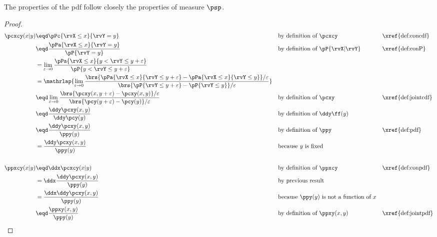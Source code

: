 The properties of the pdf follow closely the properties of measure $\psp$.
\begin{theorem}
\label{thm:conpdf}
\end{theorem}
\begin{proof}
\begin{align*}
  \pcxcy(x|y)
    &\eqd \pPc{\rvX\le x}{\rvY=y}
    &&    \text{by definition of $\pcxcy$}              &&\text{\xref{def:concdf}}
  \\&\eqd \frac{\pPa{\rvX\le x}{\rvY=y}}{\pP{\rvY=y}}
    &&    \text{by definition of $\pP{\rvX|\rvY}$}         &&\text{\xref{def:conP}}
  \\&=    \lim_{\varepsilon\to0}\frac{\pPa{\rvX\le x}{y<\rvY\le y+\varepsilon}}
                                         {\pP{y<\rvY\le y+\varepsilon}}
  \\&=\mathrlap{\lim_{\varepsilon\to0}\frac{\brs{\pPa{\rvX\le x}{\rvY\le y+\varepsilon}-\pPa{\rvX\le x}{\rvY\le y}}/\varepsilon}
                                         {\brs{\pP{\rvY\le y+\varepsilon}-\pP{\rvY\le y}}/\varepsilon}}
  \\&\eqd \lim_{\varepsilon\to0}\frac{\brs{\pcxy(x,y+\varepsilon)-\pcxy(x,y)}/\varepsilon}
                                         {\brs{\pcy(y+\varepsilon)-\pcy(y)}/\varepsilon}
    &&    \text{by definition of $\pcxy$}                  &&\text{\xref{def:jointcdf}}
  \\&\eqd \frac{\ddy\pcxy(x,y)}{\ddy\pcy(y)}
    &&    \text{by definition of $\ddy\ff(y)$}
  \\&\eqd \frac{\ddy\pcxy(x,y)}{\ppy(y)}
    &&    \text{by definition of $\ppy$}  &&\text{\xref{def:pdf}}
  \\&=    \frac{\ddy\pcxy(x,y)}{\ppy(y)}
    &&    \text{because $y$ is fixed}
  \\
  \\
  \ppxcy(x|y)
    &\eqd \ddx\pcxcy(x|y)                     &&\text{by definition of $\ppxcy$}                  &&\text{\xref{def:conpdf}}
  \\&=    \ddx\frac{\ddy\pcxy(x,y)}{\ppy(y)}  &&\text{by previous result}
  \\&=    \frac{\ddx\ddy\pcxy(x,y)}{\ppy(y)}  &&\text{because $\ppy(y)$ is not a function of $x$}
  \\&\eqd \frac{\ppxy(x,y)}{\ppy(y)}          &&\text{by definition of $\ppxy(x,y)$}              &&\text{\xref{def:jointpdf}}
\end{align*}


\end{proof}
